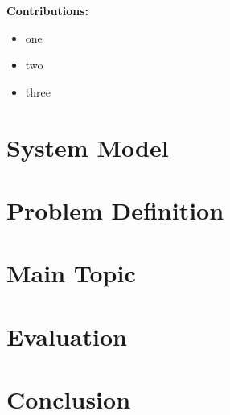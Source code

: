\documentclass[conference]{resources/IEEEtran}
\theoremstyle{definition}
\theoremstyle{remark}
\begin{document}
	
	
	
	\noindent\textbf{Contributions:} %
	\begin{itemize}
		\item one
		\item two
		\item three
	\end{itemize}
	
	
\section{System Model}
\label{sec:system_model}

\section{Problem Definition}
\label{sec:problem_def}

\section{Main Topic}

\section{Evaluation}
\label{sec:evaluation}
	

	
\section{Conclusion}
\label{sec:conclusion}
	


\label{last-page}
\clearpage
%
%
	
\end{document}

